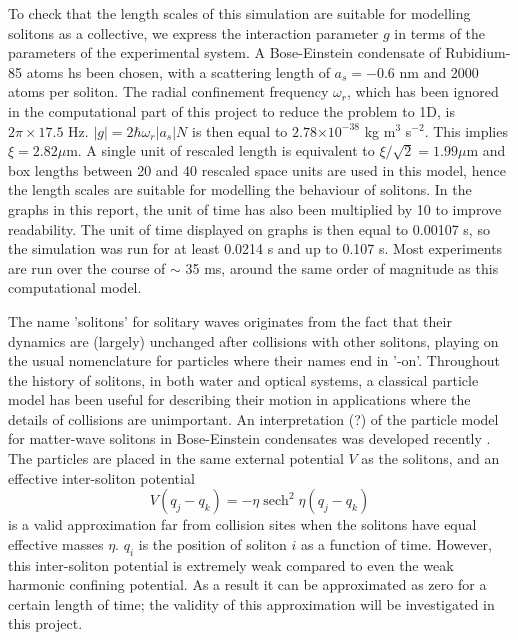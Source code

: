 \documentclass[10pt, twocolumn]{revtex4}    %
\DeclareMathOperator{\sech}{sech}		%
\providecommand{\e}[1]{\ensuremath{\times 10^{#1}}} %
\begin{document}
To check that the length scales of this simulation are suitable for modelling solitons as a collective, we express the interaction parameter $g$ in terms of the parameters of the experimental system. A Bose-Einstein condensate of Rubidium-85 atoms hs been chosen, with a scattering length of $a_s = -0.6$ nm and 2000 atoms per soliton. The radial confinement frequency $\omega_r$, which has been ignored in the computational part of this project to reduce the problem to 1D, is $2\pi \times 17.5$ Hz. $|g| = 2\hbar \omega_r |a_s| N$ is then equal to $2.78 \e{-38}$ kg m$^3$ s$^{-2}$. This implies $\xi = 2.82 \mu$m. A single unit of rescaled length is equivalent to $\xi/\sqrt{2} = 1.99 \mu$m and box lengths between 20 and 40 rescaled space units are used in this model, hence the length scales are suitable for modelling the behaviour of solitons. In the graphs in this report, the unit of time has also been multiplied by 10 to improve readability. The unit of time displayed on graphs is then equal to 0.00107 s, so the simulation was run for at least 0.0214 s and up to 0.107 s. Most experiments are run over the course of $\sim$ 35 ms, around the same order of magnitude as this computational model. 

The name 'solitons' for solitary waves originates from the fact that their dynamics are (largely) unchanged after collisions with other solitons, playing on the usual nomenclature for particles where their names end in '-on'. Throughout the history of solitons, in both water and optical systems, a classical particle model has been useful for describing their motion in applications where the details of collisions are unimportant. An interpretation (?) of the particle model for matter-wave solitons in Bose-Einstein condensates was developed recently \cite{Martin}. The particles are placed in the same external potential $V$ as the solitons, and an effective inter-soliton potential 
\begin{equation}
V(q_j - q_k) = -\eta \sech^2{\eta(q_j - q_k)}
\end{equation}
is a valid approximation far from collision sites when the solitons have equal effective masses $\eta$. $q_i$ is the position of soliton $i$ as a function of time. However, this inter-soliton potential is extremely weak compared to even the weak harmonic confining potential. As a result it can be approximated as zero for a certain length of time; the validity of this approximation will be investigated in this project. 

\end{document}
